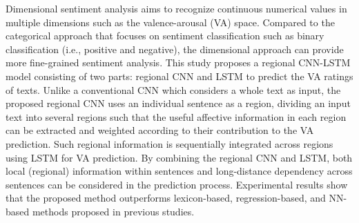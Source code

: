 Dimensional sentiment analysis aims to recognize continuous numerical values in multiple dimensions such as the valence-arousal (VA) space. Compared to the categorical approach that focuses on sentiment classification such as binary classification (i.e., positive and negative), the dimensional approach can provide more fine-grained sentiment analysis. This study proposes a regional CNN-LSTM model consisting of two parts: regional CNN and LSTM to predict the VA ratings of texts. Unlike a conventional CNN which considers a whole text as input, the proposed regional CNN uses an individual sentence as a region, dividing an input text into several regions such that the useful affective information in each region can be extracted and weighted according to their contribution to the VA prediction. Such regional information is sequentially integrated across regions using LSTM for VA prediction. By combining the regional CNN and LSTM, both local (regional) information within sentences and long-distance dependency across sentences can be considered in the prediction process. Experimental results show that the proposed method outperforms lexicon-based, regression-based, and NN-based methods proposed in previous studies.
